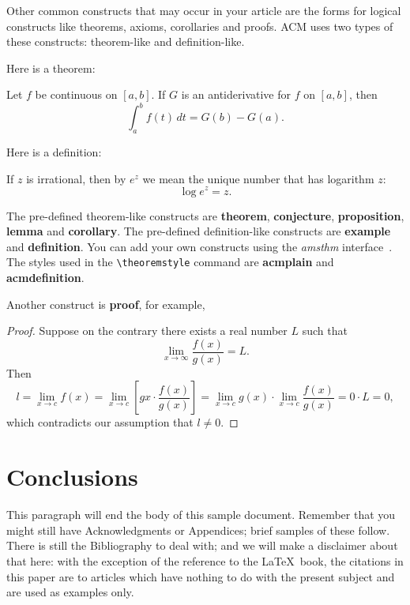 Other common constructs that may occur in your article are the forms
for logical constructs like theorems, axioms, corollaries and proofs.
ACM uses two types of these constructs:  theorem-like and
definition-like.

Here is a theorem:
\begin{theorem}
  Let $f$ be continuous on $[a,b]$.  If $G$ is
  an antiderivative for $f$ on $[a,b]$, then
  \begin{displaymath}
    \int^b_af(t)\,dt = G(b) - G(a).
  \end{displaymath}
\end{theorem}

Here is a definition:
\begin{definition}
  If $z$ is irrational, then by $e^z$ we mean the
  unique number that has
  logarithm $z$:
  \begin{displaymath}
    \log e^z = z.
  \end{displaymath}
\end{definition}

The pre-defined theorem-like constructs are \textbf{theorem},
\textbf{conjecture}, \textbf{proposition}, \textbf{lemma} and
\textbf{corollary}.  The pre-defined de\-fi\-ni\-ti\-on-like constructs are
\textbf{example} and \textbf{definition}.  You can add your own
constructs using the \textsl{amsthm} interface~\cite{Amsthm15}.  The
styles used in the \verb|\theoremstyle| command are \textbf{acmplain}
and \textbf{acmdefinition}.

Another construct is \textbf{proof}, for example,

\begin{proof}
  Suppose on the contrary there exists a real number $L$ such that
  \begin{displaymath}
    \lim_{x\rightarrow\infty} \frac{f(x)}{g(x)} = L.
  \end{displaymath}
  Then
  \begin{displaymath}
    l=\lim_{x\rightarrow c} f(x)
    = \lim_{x\rightarrow c}
    \left[ g{x} \cdot \frac{f(x)}{g(x)} \right ]
    = \lim_{x\rightarrow c} g(x) \cdot \lim_{x\rightarrow c}
    \frac{f(x)}{g(x)} = 0\cdot L = 0,
  \end{displaymath}
  which contradicts our assumption that $l\neq 0$.
\end{proof}

\section{Conclusions}
This paragraph will end the body of this sample document.
Remember that you might still have Acknowledgments or
Appendices; brief samples of these
follow.  There is still the Bibliography to deal with; and
we will make a disclaimer about that here: with the exception
of the reference to the \LaTeX\ book, the citations in
this paper are to articles which have nothing to
do with the present subject and are used as
examples only.



